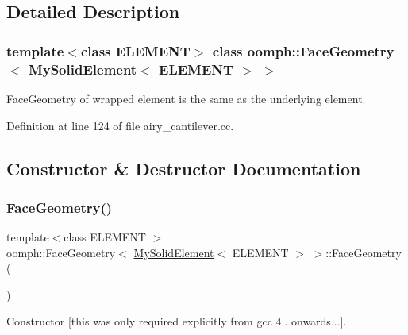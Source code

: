 \subsection{Detailed Description}
\subsubsection*{template$<$class E\+L\+E\+M\+E\+NT$>$\newline
class oomph\+::\+Face\+Geometry$<$ My\+Solid\+Element$<$ E\+L\+E\+M\+E\+N\+T $>$ $>$}

Face\+Geometry of wrapped element is the same as the underlying element. 

Definition at line 124 of file airy\+\_\+cantilever.\+cc.



\subsection{Constructor \& Destructor Documentation}
\mbox{\label{classoomph_1_1FaceGeometry_3_01MySolidElement_3_01ELEMENT_01_4_01_4_a4b9e14efef623686f22fb2d3747e16c3}} 
\subsubsection{\texorpdfstring{Face\+Geometry()}{FaceGeometry()}\hspace{0.1cm}{\footnotesize\ttfamily [1/2]}}
{\footnotesize\ttfamily template$<$class E\+L\+E\+M\+E\+NT $>$ \\
oomph\+::\+Face\+Geometry$<$ \hyperlink{classoomph_1_1MySolidElement}{My\+Solid\+Element}$<$ E\+L\+E\+M\+E\+NT $>$ $>$\+::Face\+Geometry (\begin{DoxyParamCaption}{ }\end{DoxyParamCaption})\hspace{0.3cm}{\ttfamily [inline]}}



Constructor \mbox{[}this was only required explicitly from gcc 4.. onwards...\mbox{]}. 



